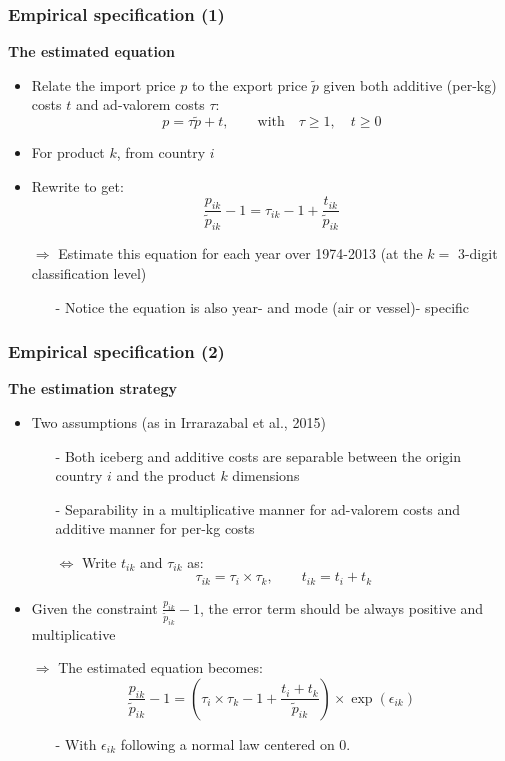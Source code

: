 \documentclass[10 pt,Helvetica, french]{beamer}
\begin{document}
\begin{frame}
\frametitle{Empirical specification (1)}
\textbf{The estimated equation}
\begin{itemize}
\item Relate the import price $p$ to the export price $\widetilde{p}$ given both additive (per-kg) costs $t$ and ad-valorem costs $\tau$:
$$p = \tau \widetilde{p} + t, \qquad \text{with}\quad \tau \geq 1,\quad t \geq 0$$
\item For product $k$, from country $i$  \vspace{0.1cm}
\item Rewrite to get:
$$\frac{p_{ik}}{\widetilde{p}_{ik}} -1 = \tau_{ik} -1 +\frac{t_{ik}}{ \widetilde{p}_{ik}}$$
\item[$\Rightarrow$] Estimate this equation for each year over 1974-2013 (at the $k=$ 3-digit classification level) \vspace{0.1cm}
\begin{itemize}
\item[-] Notice the equation is also year- and mode (air or vessel)- specific
\end{itemize}
\end{itemize}
\end{frame}

\begin{frame}
\frametitle{Empirical specification (2)}
\textbf{The estimation strategy}
\begin{itemize}
\item Two assumptions (as in Irrarazabal et al., 2015) \vspace{0.1cm}
\begin{itemize}
\item[-] Both iceberg and additive costs are separable between the origin country $i$ and the product $k$ dimensions \vspace{0.1cm}
\item[-] Separability in a multiplicative manner for ad-valorem costs and additive manner for per-kg costs \vspace{0.1cm}
\item[$\Leftrightarrow$] Write $t_{ik}$ and $\tau_{ik}$ as:
\begin{equation}
 \tau_{ik} = \tau_{i} \times \tau_{k}, \qquad t_{ik} = t_{i} + t_{k} \label{eq:specifTC}
 \end{equation}
\end{itemize}
\item Given the constraint $\frac{p_{ik}}{\widetilde{p}_{ik}} -1$, the error term should be always positive and multiplicative \vspace{0.1cm}
\item[$\Rightarrow$] The estimated equation becomes:
$$\frac{p_{ik}}{\widetilde{p}_{ik}}-1 =\left(\tau_{i} \times \tau_{k} -1+\frac{t_{i} + t_{k}}{\widetilde{p}_{ik}} \right)\times \exp(\epsilon_{ik})$$
\begin{itemize}
\item[-] With $\epsilon_{ik}$ following a normal law centered on 0.
\end{itemize}

\end{itemize}
\end{frame}
\end{document}
